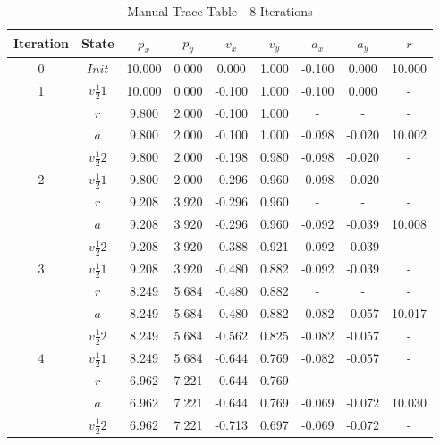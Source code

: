 \begin{table}[h]
\footnotesize
\centering
\caption{Manual Trace Table - 8 Iterations}
\def\arraystretch{1.5}
\begin{tabular}{|c|c|c|c|c|c|c|c|c|} \hline
Iteration & State    &   $p_x$ &  $p_y$ &  $v_x$ &  $v_y$ &  $a_x$ &  $a_y$ &  $r$   \\ \hline
0 & $Init$           &  10.000 &	0.000 &	 0.000 &	1.000 &	-0.100 &  0.000 & 10.000 \\ \hline
1 & $v\frac{1}{2}1$	 &  10.000 &  0.000 &	-0.100 &	1.000 &	-0.100 &  0.000 & -      \\ \hline
  & $r$	             &   9.800 &	2.000	& -0.100 & 	1.000	&	-	     & -      & -      \\ \hline
  & $a$	             &   9.800 &	2.000 &	-0.100 &	1.000 &	-0.098 & -0.020 &	10.002 \\ \hline
  & $v\frac{1}{2}2$	 &   9.800 &	2.000 &	-0.198 &	0.980 &	-0.098 & -0.020	& -      \\ \hline
2 & $v\frac{1}{2}1$	 &   9.800 &	2.000 &	-0.296 &	0.960 &	-0.098 & -0.020	& -      \\ \hline
  & $r$	             &   9.208 &	3.920 &	-0.296 &	0.960	&	-	     & -      & -      \\ \hline
  & $a$	             &   9.208 &	3.920 &	-0.296 &	0.960 &	-0.092 & -0.039 &	10.008 \\ \hline
  & $v\frac{1}{2}2$  &	 9.208 &	3.920 &	-0.388 &	0.921 &	-0.092 & -0.039	& -      \\ \hline
3 & $v\frac{1}{2}1$  &	 9.208 &	3.920	& -0.480 &	0.882 &	-0.092 & -0.039 &	-      \\ \hline
  & $r$              & 	 8.249 &	5.684	& -0.480 &	0.882 &	-		   & -      & -      \\ \hline
  & $a$              &	 8.249 &	5.684	& -0.480 &	0.882	& -0.082 & -0.057	& 10.017 \\ \hline
  & $v\frac{1}{2}2$  &	 8.249 &	5.684	& -0.562 &	0.825	& -0.082 & -0.057	& -      \\ \hline
4 & $v\frac{1}{2}1$  &	 8.249 &	5.684	& -0.644 &	0.769	& -0.082 & -0.057	& -      \\ \hline
  & $r$	             &   6.962 &	7.221	& -0.644 &	0.769	&	-	     & -      & -      \\ \hline
  & $a$              &   6.962 &	7.221	& -0.644 &	0.769	& -0.069 & -0.072 &	10.030 \\ \hline
  & $v\frac{1}{2}2$  &	 6.962 &	7.221 &	-0.713 &	0.697 &	-0.069 & -0.072	& -      \\ \hline

\end{tabular}
\end{table}
